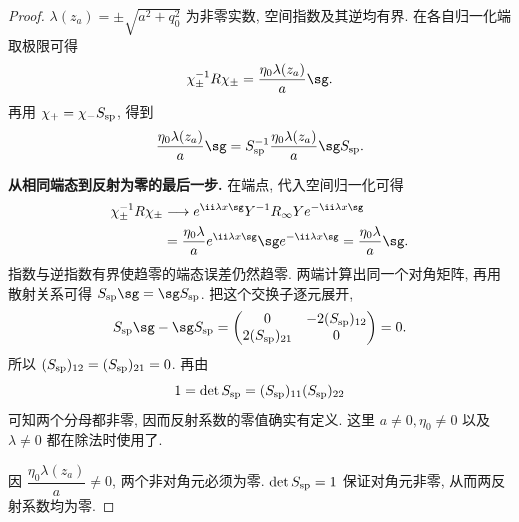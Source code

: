 \begin{proof}
$\lambda(z_a)=\pm\sqrt{a^2+q_0^2}$ 为非零实数, 空间指数及其逆均有界. 在各自归一化端取极限可得
\[
\chi_\pm^{-1}R\chi_\pm=\dfrac{\eta_0\lambda(z_a)}{a}\sg.
\]
再用 $\chi_+=\chi_-S_{\rm sp}$, 得到
\[
\dfrac{\eta_0\lambda(z_a)}{a}\sg
=S_{\rm sp}^{-1}\dfrac{\eta_0\lambda(z_a)}{a}\sg S_{\rm sp}.
\]

\par\medskip\noindent\textbf{从相同端态到反射为零的最后一步.}\quad 
在端点, 代入空间归一化可得
\begin{align*}
\chi_\pm^{-1}R\chi_\pm
&\longrightarrow e^{\ii\lambda x\sg}Y^{-1}R_\infty Y
 e^{-\ii\lambda x\sg}\\
&=\dfrac{\eta_0\lambda}{a}
 e^{\ii\lambda x\sg}\sg e^{-\ii\lambda x\sg}
=\dfrac{\eta_0\lambda}{a}\sg.
\end{align*}
指数与逆指数有界使趋零的端态误差仍然趋零.
两端计算出同一个对角矩阵, 再用散射关系可得
$S_{\rm sp}\sg=\sg S_{\rm sp}$.
把这个交换子逐元展开,
\[
S_{\rm sp}\sg-\sg S_{\rm sp}
=\begin{pmatrix}
0&-2(S_{\rm sp})_{12}\\2(S_{\rm sp})_{21}&0
\end{pmatrix}=0.
\]
所以 $(S_{\rm sp})_{12}=(S_{\rm sp})_{21}=0$.
再由
\[
1=\det S_{\rm sp}=(S_{\rm sp})_{11}(S_{\rm sp})_{22}
\]
可知两个分母都非零, 因而反射系数的零值确实有定义.
这里 $a\ne0,\eta_0\ne0$ 以及 $\lambda\ne0$ 都在除法时使用了.

因 $\dfrac{\eta_0\lambda(z_a)}{a}\ne0$, 两个非对角元必须为零. $\det S_{\rm sp}=1$ 保证对角元非零, 从而两反射系数均为零.
\end{proof}
